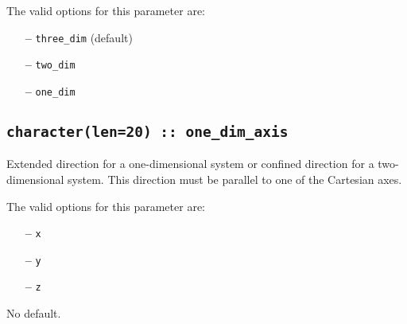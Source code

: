 The valid options for this parameter are:
\begin{itemize}
\item[{\bf --}] \verb#three_dim#  (default)
\item[{\bf --}] \verb#two_dim#  
\item[{\bf --}] \verb#one_dim# 
\end{itemize}

\subsection[one\_dim\_axis]{\tt character(len=20) :: one\_dim\_axis}

Extended direction for a one-dimensional system
or confined direction for a two-dimensional system.
This direction must be parallel to one of the Cartesian axes.

The valid options for this parameter are:
\begin{itemize}
\item[{\bf --}] \verb#x#
\item[{\bf --}] \verb#y#
\item[{\bf --}] \verb#z# 
\end{itemize}

No default.


%

